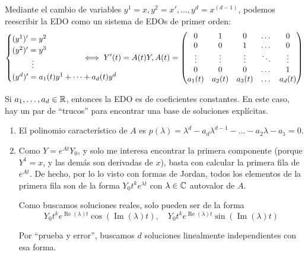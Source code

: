 Mediante el cambio de variables $y^1 = x, y^2 = x', \dots, y^d = x^{(d-1)}$, podemos reescribir la EDO como un sistema de EDOs de primer orden:
\[\begin{cases}
		(y^1)' = y^2                \\
		(y^2)' = y^3                \\
		\quad \quad \, \, \, \vdots \\
		(y^d)' = a_1(t) y^1 + \dots + a_d(t) y^d
	\end{cases} \hspace{-2cm} \iff Y'(t) = A(t)Y, A(t)= \begin{pmatrix}
		0      & 1      & 0      & \dots  & 0      \\
		0      & 0      & 1      & \dots  & 0      \\
		\vdots & \vdots & \vdots & \ddots & \vdots \\
		0      & 0      & 0      & \dots  & 1      \\
		a_1(t) & a_2(t) & a_3(t) & \dots  & a_d(t)
	\end{pmatrix}\]


Si $a_1, \dots, a_d \in \mathbb{R}$, entonces la EDO es de coeficientes constantes. En este caso, hay un par de ``trucos'' para encontrar una base de soluciones explícitas.
\begin{enumerate}
	\item El polinomio característico de $A$ es $p(\lambda) = \lambda^d - a_d \lambda^{d-1} - \dots - a_2\lambda - a_1 = 0$.
	\item Como $Y= e^{At}Y_0$, y solo me interesa encontrar la primera componente (porque $Y^1 = x$, y las demás son derivadas de $x$), basta con calcular la primera fila de $e^{At}$. De hecho, por lo lo visto con formas de Jordan, todos los elementos de la primera fila son de la forma $Y_0t^k e^{\lambda t}$ con $\lambda \in \mathbb{C}$ autovalor de $A$.

	      Como buscamos soluciones reales, solo pueden ser de la forma
	      \[Y_0t^k e^{\operatorname{Re}(\lambda) t} \cos(\operatorname{Im}(\lambda) t), \quad Y_0t^k e^{\operatorname{Re}(\lambda) t} \sin(\operatorname{Im}(\lambda) t)\]

	      Por ``prueba y error'', buscamos $d$ soluciones linealmente independientes con esa forma.
\end{enumerate}

